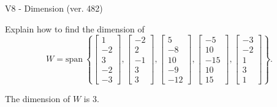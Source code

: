 \begin{exercise}
  \begin{exerciseTitle}V8 - Dimension (ver. 482)\end{exerciseTitle}
  \begin{exerciseStatement}
    Explain how to find the dimension of 
\[W=\mathrm{span}\ \left\{\left[\begin{array}{r}
1 \\
-2 \\
3 \\
-2 \\
-3
\end{array}\right] , \left[\begin{array}{r}
-2 \\
2 \\
-1 \\
3 \\
3
\end{array}\right] , \left[\begin{array}{r}
5 \\
-8 \\
10 \\
-9 \\
-12
\end{array}\right] , \left[\begin{array}{r}
-5 \\
10 \\
-15 \\
10 \\
15
\end{array}\right] , \left[\begin{array}{r}
-3 \\
-2 \\
1 \\
3 \\
1
\end{array}\right]\right\}.\]



  \end{exerciseStatement}
  \begin{exerciseAnswer}
   The dimension of \(W\) is  \(3\).
  


  \end{exerciseAnswer}
\end{exercise}